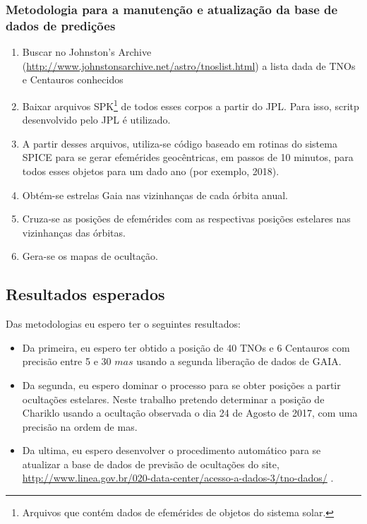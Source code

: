 \documentclass[a4paper, 11pt]{article}
\begin{document}
\subsubsection{Metodologia para a manuten\c c\~ao e atualiza\c c\~ao da base de dados de predi\c c\~oes}
\begin{enumerate}
  \item Buscar no Johnston's Archive (\url{http://www.johnstonsarchive.net/astro/tnoslist.html}) a lista dada de TNOs e Centauros conhecidos
  \item Baixar arquivos SPK\footnote{Arquivos que cont\'em dados de efem\'erides de objetos do sistema solar.} de todos esses corpos a partir do JPL. Para isso, scritp desenvolvido pelo JPL \'e utilizado.
  \item A partir desses arquivos, utiliza-se c\'odigo baseado em rotinas do sistema SPICE para se gerar efem\'erides geoc\^entricas, em passos de 10 minutos, para todos esses objetos para um dado ano (por exemplo, 2018).
  \item Obt\'em-se estrelas Gaia nas vizinhan\c cas de cada \'orbita anual.
  \item Cruza-se as posi\c c\~oes de efem\'erides com as respectivas posi\c c\~oes estelares nas vizinhan\c cas das \'orbitas.
  \item Gera-se os mapas de oculta\c c\~ao.
\end{enumerate}

\subsection{Resultados esperados}

Das metodologias eu espero ter o seguintes resultados:
\begin{itemize}
  \item Da primeira, eu espero ter obtido a posição de 40 TNOs e 6 Centauros com precisão entre 5 e 30 $mas$ usando a segunda liberação de dados de GAIA.
  \item Da segunda, eu espero dominar o processo para se obter posições a partir ocultações estelares. Neste trabalho pretendo determinar a posição de Chariklo usando a ocultação observada o dia 24 de Agosto de 2017, com uma precisão na ordem de mas. 
  \item Da ultima, eu espero desenvolver o procedimento automático para se atualizar a base de dados de previsão de ocultações do site,  \url{http://www.linea.gov.br/020-data-center/acesso-a-dados-3/tno-dados/} .    
\end{itemize}
\end{document}
